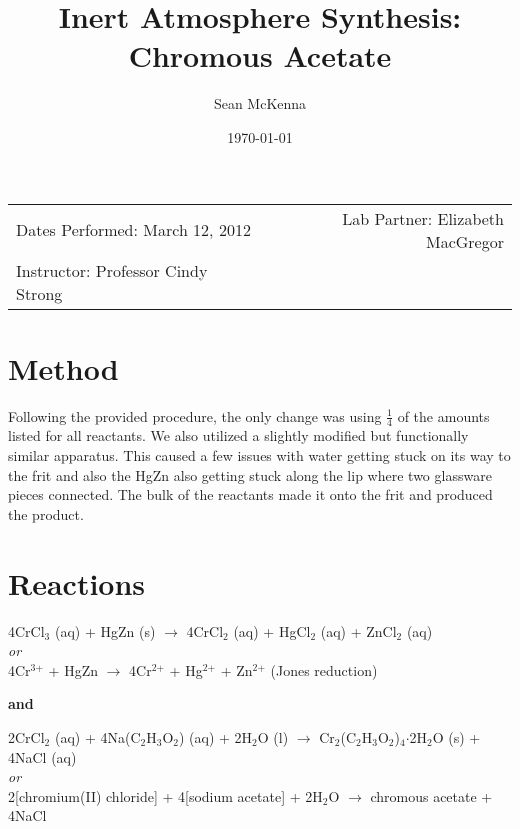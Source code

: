 \documentclass[11pt]{article}
\title{Inert Atmosphere Synthesis: Chromous Acetate}
\author{Sean McKenna}
\date{\today}
\newcommand{\super}[1]{\ensuremath{^{\textrm{#1}}}}
\newcommand{\sub}[1]{\ensuremath{_{\textrm{#1}}}}
\begin{document}
\maketitle

\begin{center}
\begin{tabular}{lr}
Dates Performed: March 12, 2012 & Lab Partner: Elizabeth MacGregor\\
Instructor: Professor Cindy Strong
\end{tabular}
\end{center}


\section{Method}
Following the provided procedure,\cite{lab} the only change was using $\frac{1}{4}$ of the amounts listed for all reactants. We also utilized a slightly modified but functionally similar apparatus. This caused a few issues with water getting stuck on its way to the frit and also the HgZn also getting stuck along the lip where two glassware pieces connected. The bulk of the reactants made it onto the frit and produced the product.


\section{Reactions}
\begin{center}
4CrCl\sub{3} (aq) + HgZn (s) $\rightarrow$ 4CrCl\sub{2} (aq) + HgCl\sub{2} (aq) + ZnCl\sub{2} (aq) \\
\textit{or} \\
4Cr\super{3+} + HgZn $\rightarrow$ 4Cr\super{2+} + Hg\super{2+} + Zn\super{2+}   (Jones reduction) \bigskip

\textbf{and} \bigskip

2CrCl\sub{2} (aq) + 4Na(C\sub{2}H\sub{3}O\sub{2}) (aq) + 2H\sub{2}O (l) $\rightarrow$ Cr\sub{2}(C\sub{2}H\sub{3}O\sub{2})\sub{4}$\cdot$2H\sub{2}O (s) + 4NaCl (aq) \\
\textit{or} \\
2[chromium(II) chloride] + 4[sodium acetate] + 2H\sub{2}O $\rightarrow$ chromous acetate + 4NaCl \\
\end{center}


\end{document}

